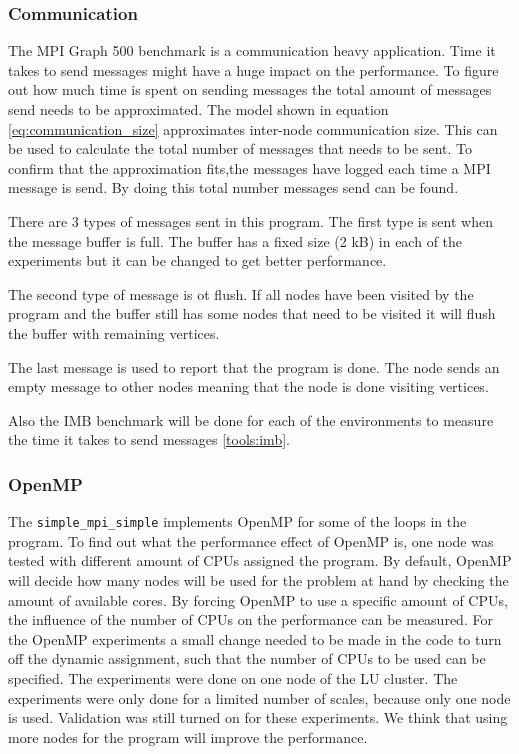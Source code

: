\subsubsection{Communication}
\label{med:comm}
The MPI Graph 500 benchmark is a communication heavy application. Time it takes to send messages might have a huge impact on the performance. To figure out how much time is spent on sending messages the total amount of messages send needs to be approximated. The model shown in equation \ref{eq:communication_size} approximates inter-node communication size. This can be used to calculate the total number of messages that needs to be sent. To confirm that the approximation fits,the messages have logged each time a MPI message is send. By doing this total number messages send can be found.

There are 3 types of messages sent in this program. The first type is sent when the message buffer is full. The buffer has a fixed size (2 kB) in each of the experiments but it can be changed to get better performance. 

The second type of message is ot flush. If all nodes have been visited by the program and the buffer still has some nodes that need to be visited it will flush the buffer with remaining vertices.

The last message is used to report that the program is done. The node sends an empty message to other nodes meaning that the node is done visiting vertices.

Also the IMB benchmark will be done for each of the environments to measure the time it takes to send messages \ref{tools:imb}.

\subsubsection{OpenMP}
The \texttt{simple\_mpi\_simple} implements OpenMP for some of the loops in the program. To find out what the performance effect of OpenMP is, one node was tested with different amount of CPUs assigned the program. By default, OpenMP will decide how many nodes will be used for the problem at hand by checking the amount of available cores. By forcing OpenMP to use a specific amount of CPUs, the influence of the number of CPUs on the performance can be measured. For the OpenMP experiments a small change needed to be made in the code to turn off the dynamic assignment, such that the number of CPUs to be used can be specified. The experiments were done on one node of the LU cluster. The experiments were only done for a limited number of scales, because only one node is used. Validation was still turned on for these experiments. We think that using more nodes for the program will improve the performance.

